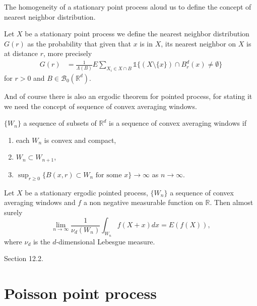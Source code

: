 
The homogeneity of a stationary point process aloud us to define the concept of nearest neighbor distribution.
\begin{defn} Let $X$ be a stationary point process we define the nearest neighbor distribution $G(r)$ as the probability that given that $x$ is in $X$, its nearest neighbor on $X$ is at distance $r$, more precisely 
\begin{align}
G(r)&=\frac{1}{\Lambda(B)}E\sum_{X_i\in X\cap B}\mathds{1}\lbrace (X\setminus\lbrace x\rbrace)\cap B^d_r(x)\neq\emptyset\rbrace\nonumber
\end{align}
for $r>0$ and $B\in\mathcal{B}_0(\mathbb{R}^d)$.
\end{defn}

And of course there is also an ergodic theorem for pointed process, for stating it we need the concept of sequence of convex averaging windows.

\begin{defn} $\lbrace W_n\rbrace$ a sequence of subsets of $\mathbb{R}^d$ is a sequence of convex averaging windows if
\begin{enumerate}
\item each $W_n$ is convex and compact,
\item $W_n\subset W_{n+1}$,
\item $\sup_{r\geq 0} \lbrace  B(x,r)\subset W_n\mbox{ for some }x\rbrace\rightarrow\infty$ as $n\rightarrow\infty$.
\end{enumerate}
\end{defn}
 
 \begin{thm} Let $X$ be a stationary ergodic pointed process, $\lbrace W_n\rbrace$ a sequence of convex averaging windows and $f$ a non negative measurable function on $\mathbb{R}$. Then almost surely $$\lim_{n\rightarrow\infty}\frac{1}{\nu_d(W_n)}\int_{W_n} f(X+x)dx=E(f(X)), $$ where $\nu_d$ is the $d$-dimensional Lebesgue measure.
 \end{thm}
\cite{Dal} Section 12.2.

\section{Poisson point process}
 
